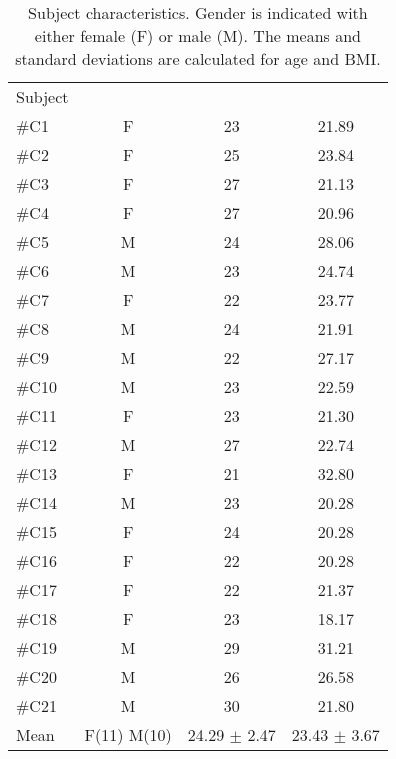 \begin{longtable}{l|c|c|c}
		\caption{Subject characteristics. Gender is indicated with either female (F) or male (M). The means and standard deviations are calculated for age and BMI.}
	\label{tab:subjectsB} \\
\cellcolor[HTML]{C0C0C0} {Subject} & 
\cellcolor[HTML]{C0C0C0}{Age} & \cellcolor[HTML]{C0C0C0}{Gender}  & \cellcolor[HTML]{C0C0C0}{BMI}  	\\  \rule{0pt}{3ex} 
\#C1 &  F & 23 & 21.89 \\ \hline \hline \rule{0pt}{3ex} 
\#C2 & F & 25 & 23.84 \\ \hline \hline \rule{0pt}{3ex} 
\#C3 & F & 27 & 21.13 \\ \hline \hline \rule{0pt}{3ex} 
\#C4 & F & 27 & 20.96\\ \hline \hline \rule{0pt}{3ex} 
\#C5 & M & 24 & 28.06 \\ \hline \hline \rule{0pt}{3ex} 
\#C6 & M & 23 &  24.74 \\ \hline \hline \rule{0pt}{3ex} 
\#C7 & F & 22 & 23.77 \\ \hline \hline \rule{0pt}{3ex} 
	\#C8 & M & 24 & 21.91 \\ \hline \hline \rule{0pt}{3ex} 
	\#C9 & M & 22 & 27.17  \\ \hline \hline \rule{0pt}{3ex} 
	\#C10 & M & 23 &  22.59 \\ \hline \hline \rule{0pt}{3ex} 
\#C11 & F & 23  & 21.30 \\ \hline \hline \rule{0pt}{3ex} 
\#C12 & M & 27 & 22.74 \\ \hline \hline \rule{0pt}{3ex} 
\#C13 & F  & 21 & 32.80  \\ \hline \hline \rule{0pt}{3ex} 
\#C14 & M &  23 & 20.28 \\ \hline \hline \rule{0pt}{3ex} 
\#C15 & F & 24 &  20.28 \\ \hline \hline \rule{0pt}{3ex} 
	\#C16 & F & 22  & 20.28 \\ \hline \hline \rule{0pt}{3ex} 
	\#C17 & F  & 22 &  21.37\\ \hline \hline \rule{0pt}{3ex} 
	\#C18 & F & 23  & 18.17   \\ \hline \hline \rule{0pt}{3ex}
		\#C19 &  M & 29 & 31.21 \\ \hline \hline \rule{0pt}{3ex} 
	\#C20 & M & 26 & 26.58  \\ \hline \hline \rule{0pt}{3ex}  	
	\#C21 & M & 30 & 21.80  \\ \hline \hline \rule{0pt}{3ex}  
Mean & F(11) M(10) & 24.29 $\pm$ 2.47 & 23.43 $\pm$ 3.67
	\\ \hline 	
\end{longtable}
\vspace{-.5cm}
